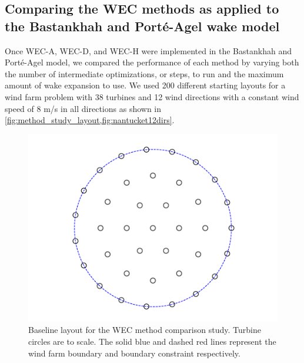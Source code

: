 \documentclass[a4paper]{jpconf}
\begin{document}
\subsection{Comparing the WEC methods as applied to the Bastankhah and Port\'e-Agel wake model}

Once WEC-A, WEC-D, and WEC-H were implemented in the Bastankhah and Port\'{e}-Agel model, we compared the performance of each method by varying both the number of intermediate optimizations, or steps, to run and the maximum amount of wake expansion to use. We used 200 different starting layouts for a wind farm problem with 38 turbines and 12 wind directions with a constant wind speed of 8 m/s in all directions as shown in \cref{fig:method_study_layout,fig:nantucket12dirs}. 

\begin{figure}[h!]
	\centering
	\begin{minipage}[t]{18pc}
		\centering
		\includegraphics[width=\textwidth, trim={1.5cm, 0cm, 2.0cm, 0cm}, clip]{final_images/layouts/38_turb_start.pdf}
		\caption{Baseline layout for the WEC method comparison study. Turbine circles are to scale. The solid blue and dashed red lines represent the wind farm boundary and boundary constraint respectively.}
		\label{fig:method_study_layout}
	\end{minipage}\hspace{1pc}%
	\begin{minipage}[t]{18pc}
		\centering

\end{minipage}
\end{figure}
\end{document}
